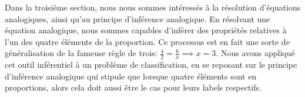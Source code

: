 Dans la troisième section, nous nous sommes intéressés à la résolution
d'équations analogiques, ainsi qu'au principe d'inférence analogique. En résolvant
une équation analogique, nous sommes capables d'inférer des propriétés
relatives à l'un des quatre éléments de la proportion. Ce processus est en fait
une sorte de généralisation de la fameuse règle de trois: $\frac{4}{2} =
\frac{6}{x} \implies x =3$. Nous avons appliqué cet outil inférentiel à un
problème de classification, en se reposant sur le principe d'inférence
analogique qui stipule que lorsque quatre éléments sont en proportions, alors
cela doit aussi être le cas pour leurs labels respectifs.
